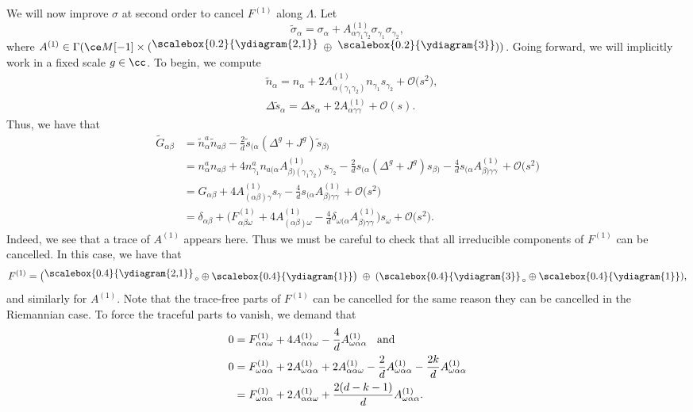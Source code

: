 We will now improve $\sigma$ at second order to cancel $F^{(1)}$ along $\Lambda$. Let
\[\tilde{\sigma}_{\alpha} = \sigma_{\alpha} + A^{(1)}_{\alpha \gamma_1 \gamma_2} \sigma_{\gamma_1} \sigma_{\gamma_2} ,\]
where $A^{(1)} \in \Gamma(\ce M[-1] \times (\raisebox{3pt}{\scalebox{0.2}{\ydiagram{2,1}}} \; \oplus \; \raisebox{2pt}{\scalebox{0.2}{\ydiagram{3}}}))$. Going forward, we will implicitly work in a fixed scale $g \in \cc$. To begin, we compute
\begin{align*}
&\tilde{n}_{\alpha} = n_{\alpha} + 2 A^{(1)}_{\alpha(\gamma_1 \gamma_2)} n_{\gamma_1} s_{\gamma_2} + \mathcal{O}\bigl(s^2\bigr), \\
& \Delta \tilde{s}_{\alpha} = \Delta s_{\alpha} + 2 A^{(1)}_{\alpha \gamma \gamma} + \mathcal{O}(s) .
\end{align*}
Thus, we have that
\begin{align*}
\tilde{G}_{\alpha \beta} &{}= \tilde{n}^a_{\alpha} \tilde{n}_{a \beta} - \frac{2}{d} \tilde{s}_{(\alpha} (\Delta^g + J^g) \tilde{s}_{\beta)} \\
&{}= n^a_{\alpha} n_{a \beta} + 4 n^a_{\gamma_1} n_{a (\alpha} A^{(1)}_{\beta)(\gamma_1 \gamma_2)} s_{\gamma_2} - \frac{2}{d} s_{(\alpha}(\Delta^g + J^g)s_{\beta)} - \frac{4}{d} s_{(\alpha} A^{(1)}_{\beta) \gamma \gamma} + \mathcal{O}\bigl(s^2\bigr) \\
&{}= G_{\alpha \beta} + 4 A^{(1)}_{(\alpha \beta) \gamma} s_{\gamma} - \frac{4}{d} s_{(\alpha} A^{(1)}_{\beta) \gamma \gamma} + \mathcal{O}\bigl(s^2\bigr)\\
&{}= \delta_{\alpha \beta} + \biggl(F^{(1)}_{\alpha \beta \omega} + 4 A^{(1)}_{(\alpha \beta) \omega} - \frac{4}{d} \delta_{\omega (\alpha} A^{(1)}_{\beta) \gamma \gamma}\biggr) s_{\omega} + \mathcal{O}\bigl(s^2\bigr) .
\end{align*}
Indeed, we see that a trace of $A^{(1)}$ appears here. Thus we must be careful to check that all irreducible components of $F^{(1)}$ can be cancelled. In this case, we have that
\[F^{(1)} = \bigl(\raisebox{3pt}{\scalebox{0.4}{\ydiagram{2,1}}}_{\,\circ} \oplus \raisebox{0pt}{\scalebox{0.4}{\ydiagram{1}}}\bigr) \; \oplus \; (\scalebox{0.4}{\ydiagram{3}}_{\,\circ} \oplus \raisebox{0pt}{\scalebox{0.4}{\ydiagram{1}}}) ,\]
and similarly for $A^{(1)}$. Note that the trace-free parts of $F^{(1)}$ can be cancelled for the same reason they can be cancelled in the Riemannian case. To force the traceful parts to vanish, we demand that
\begin{align*}
&0= F^{(1)}_{\alpha \alpha \omega} + 4 A^{(1)}_{\alpha \alpha \omega} - \frac{4}{d} A^{(1)}_{\omega \alpha \alpha} \;\;\text{ and } \\
&0= F^{(1)}_{\omega \alpha \alpha} + 2 A^{(1)}_{\omega \alpha \alpha} + 2 A^{(1)}_{\alpha \alpha \omega} - \frac{2}{d} A^{(1)}_{\omega \alpha \alpha} - \frac{2k}{d} A^{(1)}_{\omega \alpha \alpha} \\
& \hphantom{0}{}= F^{(1)}_{\omega \alpha \alpha} + 2 A^{(1)}_{\alpha \alpha \omega} + \frac{2(d-k-1)}{d} A^{(1)}_{\omega \alpha \alpha} .
\end{align*}
